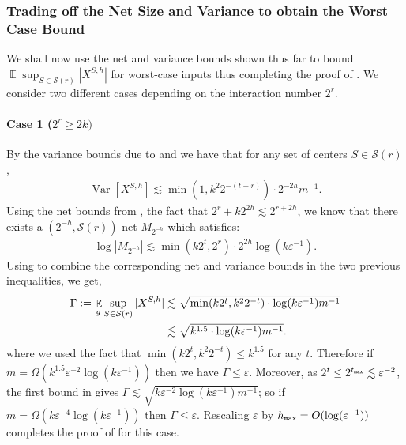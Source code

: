 \documentclass[11pt]{article}
\theoremstyle{restate}
\theoremstyle{definition}
\newcommand{\eps}{\ensuremath{\varepsilon}}
\DeclareMathOperator*{\var}{\mathrm{Var}}
\newcommand{\E}{\mathop{\mathbb{E}}}
\newcommand{\hmax}{h_\ensuremath{\textnormal{\texttt{max}}}}
\newcommand{\tmax}{t_\ensuremath{\textnormal{\texttt{max}}}}
\begin{document}
\subsubsection{Trading off the Net Size and Variance to obtain the Worst Case Bound}\label{sec: completing-the-proof-kmeans}
We shall now use the net and variance bounds shown thus far to bound $\E \sup_{S \in \mathcal{S}(r)}|X^{S,h}|$ for worst-case inputs thus completing the proof of . We consider two different cases depending on the interaction number $2^r$.

\paragraph{Case 1 ($2^r \geq 2k)$}
By the variance bounds due to  and  we have that for any set of centers  $S \in \mathcal{S}(r)$,
\begin{align*}
    \var[X^{S,h}] \lesssim  \min(1, k^2 2^{-(t+r)}) \cdot 2^{-2h} m^{-1}.
\end{align*}
Using the net bounds from , the fact that $2^r + k2^{2h} \lesssim 2^{r+2h}$, we know that there exists a $(2^{-h}, \mathcal{S}(r))$ net $M_{2^{-h}}$ which satisfies:
\begin{align*}
    \log |M_{2^{-h}}| \lesssim  \min(k2^{t}, 2^{r}) \cdot 2^{2h} \log(k\eps^{-1}).
\end{align*}
Using  to combine the corresponding net and variance bounds in the two previous inequalities, we get, 
\begin{align}
    \Gamma := \E_g \sup_{S \in \mathcal{S}(r)} |X^{S,h}| &\lesssim \sqrt{\min(k2^t, k^2 2^{-t}) \cdot \log(k \eps^{-1})m^{-1}} \label{eq: interm-combine}\\
    \notag
    &\lesssim \sqrt{k^{1.5} \cdot \log(k \eps^{-1})m^{-1}}.
\end{align}
where we used the fact that $\min(k2^t, k^2 2^{-t}) \leq k^{1.5}$ for any $t$.
Therefore  if $m =  \Omega(k^{1.5} \eps^{-2} \log(k \eps^{-1}))$ then we have $\Gamma \leq\eps$. Moreover, as $2^t \leq 2^{\tmax}\lesssim \eps^{-2}$, the first bound in  gives $\Gamma \lesssim \sqrt{k\eps^{-2}\log(k \eps^{-1}) m^{-1}}$; so if  $m = \Omega(k\eps^{-4} \log(k \eps^{-1}))$ then $\Gamma \leq \eps$. Rescaling $\eps$ by $\hmax = O(\log(\eps^{-1}))$ completes the proof of  for this case.
\end{document}
